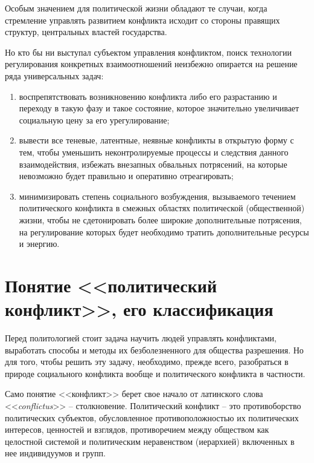 Особым значением для политической жизни обладают те случаи, когда стремление
управлять развитием конфликта исходит со стороны правящих структур, центральных
властей государства.

Но кто бы ни выступал субъектом управления конфликтом, поиск технологии
регулирования конкретных взаимоотношений неизбежно опирается на решение ряда
универсальных задач:
\begin{enumerate}
    \item воспрепятствовать возникновению конфликта либо его разрастанию и
    переходу в такую фазу и такое состояние, которое значительно увеличивает
    социальную цену за его урегулирование;
    \item вывести все теневые, латентные, неявные конфликты в открытую форму с
    тем, чтобы уменьшить неконтролируемые процессы и следствия данного
    взаимодействия, избежать внезапных обвальных потрясений, на которые
    невозможно будет правильно и оперативно отреагировать;
    \item минимизировать степень социального возбуждения, вызываемого течением
    политического конфликта в смежных областях политической (общественной)
    жизни, чтобы не сдетонировать более широкие дополнительные потрясения, на
    регулирование которых будет необходимо тратить дополнительные ресурсы и
    энергию.
\end{enumerate}

\pagebreak %

\chapter{Понятие <<политический конфликт>>, его классификация}

Перед политологией стоит задача научить людей управлять конфликтами, выработать
способы и методы их безболезненного для общества разрешения. Но для того, чтобы
решить эту задачу, необходимо, прежде всего, разобраться в природе социального
конфликта вообще и политического конфликта в частности.

Само понятие <<конфликт>> берет свое начало от латинского слова
<<\emph{conflictus}>> -- столкновение. Политический конфликт -- это
противоборство политических субъектов, обусловленное противоположностью их
политических интересов, ценностей и взглядов, противоречием между обществом как
целостной системой и политическим неравенством (иерархией) включенных в нее
индивидуумов и групп.

